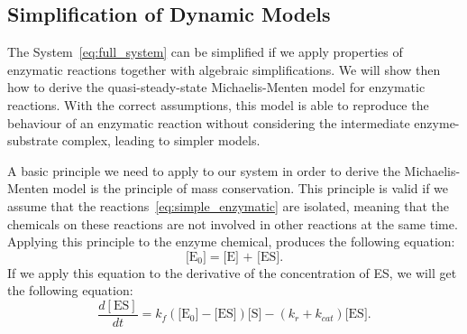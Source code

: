 \subsection{Simplification of Dynamic Models}
The System~\ref{eq:full_system} can be simplified if we
apply properties of enzymatic reactions together with algebraic 
simplifications. We will show then how to derive the quasi-steady-state 
Michaelis-Menten model for enzymatic reactions. With the correct 
assumptions, this model is able to reproduce the behaviour of an 
enzymatic reaction without considering the intermediate enzyme-substrate 
complex, leading to simpler models.

A basic principle we need to apply to our system in order to derive
the Michaelis-Menten model is the principle of mass conservation. This 
principle is valid if we assume that the 
reactions~\ref{eq:simple_enzymatic} are isolated, meaning that the 
chemicals on these reactions are not involved in other reactions at the
same time. Applying this principle to the enzyme chemical, produces the
following equation:
\begin{equation*}
    \text{[E$_0$]} = \text{[E] + [ES]}.
    \label{eq:E_conservation}
\end{equation*}
If we apply this equation to the derivative of the concentration of ES,
we will get the following equation:
\begin{equation}
    \frac{d[\text{ES}]}{dt} =  
        k_f(\text{[E$_0$]} - \text{[ES]})\text{[S]} 
        - (k_r + k_{cat}) \text{[ES]}. 
        \label{eq:dESdt_2}
\end{equation}


